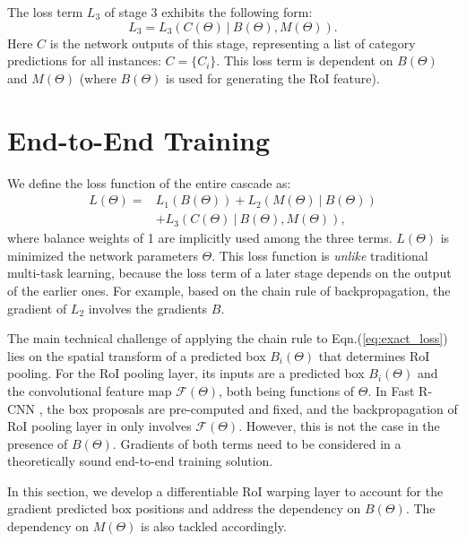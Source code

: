 \documentclass[10pt,twocolumn,letterpaper]{article}
\begin{document}
The loss term $L_3$ of stage 3 exhibits the following form:
\begin{equation}\label{eq:L3}
L_3 = L_3(C(\Theta) ~|~B(\Theta), M(\Theta)).
\end{equation}
Here $C$ is the network outputs of this stage, representing a list of category predictions for all instances: $C=\{C_i\}$. This loss term is dependent on $B(\Theta)$ and $M(\Theta)$ (where $B(\Theta)$ is used for generating the RoI feature).

\section{End-to-End Training}
\label{sec:training}

We define the loss function of the entire cascade as:
\begin{equation}
\begin{aligned}
L(\Theta) = & L_1(B(\Theta)) + L_2(M(\Theta)~|~B(\Theta)) \\
			 & + L_3(C(\Theta)~|~B(\Theta), M(\Theta)),
\end{aligned}
\label{eq:exact_loss}
\end{equation}
where balance weights of 1 are implicitly used among the three terms.
$L(\Theta)$ is minimized \wrt the network parameters $\Theta$.
This loss function is \emph{unlike} traditional multi-task learning, because the loss term of a later stage depends on the output of the earlier ones. For example, based on the chain rule of backpropagation, the gradient of $L_2$ involves the gradients \wrt $B$.

The main technical challenge of applying the chain rule to Eqn.(\ref{eq:exact_loss}) lies on the spatial transform of a predicted box $B_i(\Theta)$ that determines RoI pooling. For the RoI pooling layer, its inputs are a predicted box $B_i(\Theta)$ and the convolutional feature map $\mathcal{F}(\Theta)$, both being functions of $\Theta$. In Fast R-CNN \cite{Girshick2015}, the box proposals are pre-computed and fixed, and the backpropagation of RoI pooling layer in \cite{Girshick2015} only involves $\mathcal{F}(\Theta)$. However, this is not the case in the presence of $B(\Theta)$. Gradients of both terms need to be considered in a theoretically sound end-to-end training solution.

In this section, we develop a differentiable RoI warping layer to account for the gradient \wrt predicted box positions and address the dependency on $B(\Theta)$. The dependency on $M(\Theta)$ is also tackled accordingly.
\end{document}
